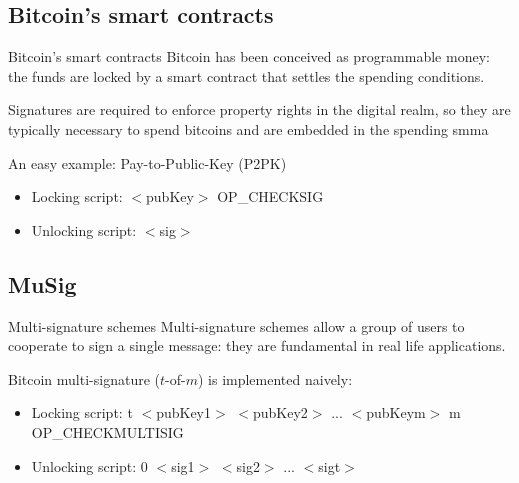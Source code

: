 \documentclass[slidescentered]{beamer}
\begin{document}
	\subsection{Bitcoin's smart contracts}
	\begin{frame}{Bitcoin's smart contracts}
		Bitcoin has been conceived as programmable money: the funds are locked by a smart contract that settles the spending conditions.
		
		\bigskip
		\noindent
		Signatures are required to enforce property rights in the digital realm, so they are typically necessary to spend bitcoins and are embedded in the spending smma
		
		\bigskip
		\noindent
		An easy example: Pay-to-Public-Key (P2PK)
		\begin{itemize}
			\item Locking script: $<$pubKey$>$ OP\_CHECKSIG
			\item Unlocking script: $<$sig$>$
		\end{itemize}
	\end{frame}
	
	\subsection{MuSig}
	\begin{frame}{Multi-signature schemes}
		Multi-signature schemes allow a group of users to cooperate to sign a single message: they are fundamental in real life applications.
		
		\bigskip
		\noindent
		Bitcoin multi-signature ($t$-of-$m$) is implemented naively:
		\begin{itemize}
			\item Locking script: t $<$pubKey1$>$ $<$pubKey2$>$ ... $<$pubKeym$>$ \hphantom{em} \hphantom{em} \hphantom{em} \hphantom{ipsem}m
			OP\_CHECKMULTISIG
			\item Unlocking script: 0 $<$sig1$>$ $<$sig2$>$ ... $<$sigt$>$
		\end{itemize}
	
		\bigskip
		\noindent

	\end{frame}
\end{document}
